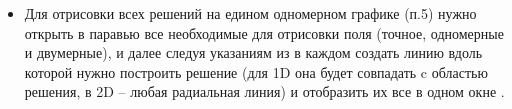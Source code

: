 \begin{itemize}
\item
Для отрисовки всех решений на едином одномерном графике (п.5) нужно открыть в паравью
все необходимые для отрисовки поля (точное, одномерные и двумерные), 
и далее следуя указаниям из 
в каждом создать линию вдоль которой нужно построить решение (для 1D она будет совпадать c областью решения,
в 2D -- любая радиальная линия) и отобразить их все в одном окне .
\end{itemize}
